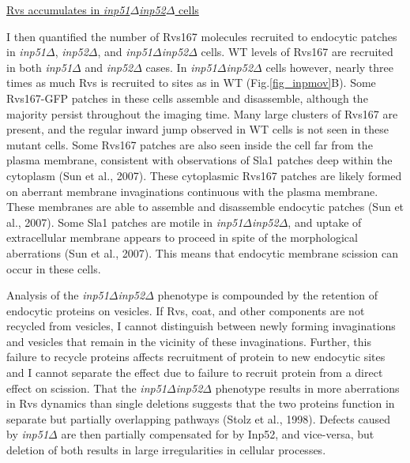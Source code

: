\newpage
\underline{Rvs accumulates in \textit{inp51$\Delta$}\textit{inp52$\Delta$} cells }

I then quantified the number of Rvs167 molecules recruited to endocytic patches in \textit{inp51$\Delta$}, \textit{inp52$\Delta$}, and \textit{inp51$\Delta$}\textit{inp52$\Delta$} cells. WT levels of Rvs167 are recruited in both \textit{inp51$\Delta$} and \textit{inp52$\Delta$} cases. In \textit{inp51$\Delta$}\textit{inp52$\Delta$} cells however, nearly three times as much Rvs is recruited to sites as in WT (Fig.\ref{fig_inpmov}B). Some Rvs167-GFP patches in these cells assemble and disassemble, although the majority persist throughout the imaging time. Many large clusters of Rvs167 are present, and the regular inward jump observed in WT cells is not seen in these mutant cells. Some Rvs167 patches are also seen inside the cell far from the plasma membrane, consistent with observations of Sla1 patches deep within the cytoplasm (Sun et al., 2007). These cytoplasmic Rvs167 patches are likely formed on  aberrant membrane invaginations continuous with the plasma membrane. These membranes are able to assemble and disassemble endocytic patches (Sun et al., 2007). Some Sla1 patches are motile in \textit{inp51$\Delta$}\textit{inp52$\Delta$}, and uptake of extracellular membrane appears to proceed in spite of the morphological aberrations (Sun et al., 2007). This means that endocytic membrane scission can occur in these cells. 



\vspace{5mm}
Analysis of the \textit{inp51$\Delta$}\textit{inp52$\Delta$} phenotype is compounded by the retention of endocytic proteins on vesicles. If Rvs, coat, and other components are not recycled from vesicles, I cannot distinguish between newly forming invaginations and vesicles that remain in the vicinity of these invaginations. Further, this failure to recycle proteins affects recruitment of protein to new endocytic sites and I cannot separate the effect due to failure to recruit protein from a direct effect on scission. That  the \textit{inp51$\Delta$}\textit{inp52$\Delta$} phenotype results in more aberrations in Rvs dynamics than single deletions suggests that the two proteins function in separate but partially overlapping pathways (Stolz et al., 1998). Defects caused by \textit{inp51$\Delta$}
are then partially compensated for by Inp52, and vice-versa, but deletion of both results in large irregularities in cellular processes.







